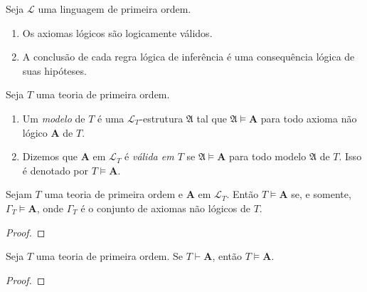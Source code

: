 \begin{theorem}
    Seja $\mathcal{L}$ uma linguagem de primeira ordem.
        \begin{enumerate}[leftmargin=*, align=left, label=\textbf{(\alph*)}]
            \item Os axiomas lógicos são logicamente válidos.
            \item A conclusão de cada regra lógica de inferência é uma consequência lógica de suas hipóteses.
        \end{enumerate}
\end{theorem}

\begin{definition}
    Seja $T$ uma teoria de primeira ordem.
        \begin{enumerate}[leftmargin=*, align=left, label=\textbf{(\alph*)}]
            \item Um \emph{modelo} de $T$ é uma $\mathcal{L}_T$-estrutura $\mathfrak{A}$ tal que $\mathfrak{A} \vDash \mathbf{A}$ para todo axioma não lógico $\mathbf{A}$ de $T$.
            \item Dizemos que $\mathbf{A}$ em $\mathcal{L}_T$ é \emph{válida em $T$} se $\mathfrak{A} \vDash \mathbf{A}$ para todo modelo $\mathfrak{A}$ de $T$. Isso é denotado por $T \vDash \mathbf{A}$.
        \end{enumerate}
\end{definition}

\begin{proposition}
    Sejam $T$ uma teoria de primeira ordem e $\mathbf{A}$ em $\mathcal{L}_T$. Então $T \vDash \mathbf{A}$ se, e somente, $\Gamma_T \vDash \mathbf{A}$, onde $\Gamma_T$ é o conjunto de axiomas não lógicos de $T$.
\end{proposition}

\begin{proof}
    \blackproof
\end{proof}

\begin{theorem}[Correção]
    Seja $T$ uma teoria de primeira ordem. Se $T \vdash \mathbf{A}$, então $T \vDash \mathbf{A}$.
\end{theorem}

\begin{proof}
    \blackproof
\end{proof}
